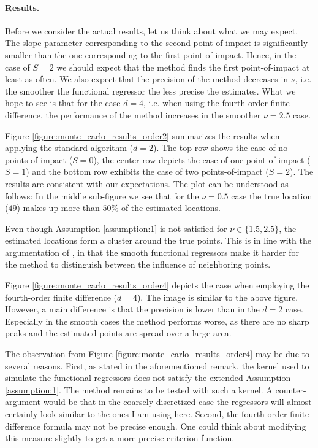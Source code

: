 \paragraph{Results.}

Before we consider the actual results, let us think about what we may expect. The slope
parameter corresponding to the second point-of-impact is significantly smaller than the
one corresponding to the first point-of-impact. Hence, in the case of $S = 2$ we should
expect that the method finds the first point-of-impact at least as often. We also expect
that the precision of the method decreases in $\nu$, i.e. the smoother the functional
regressor the less precise the estimates. What we hope to see is that for the case $d =
4$, i.e. when using the fourth-order finite difference, the performance of the method
increases in the smoother $\nu = 2.5$ case.

Figure \ref{figure:monte_carlo_results_order2} summarizes the results when applying the
standard algorithm ($d = 2$). The top row shows the case of no points-of-impact ($S =
0$), the center row depicts the case of one point-of-impact ($S = 1$) and the bottom row
exhibits the case of two points-of-impact ($S = 2$). The results are consistent with our
expectations. The plot can be understood as follows: In the middle sub-figure we see that
for the $\nu = 0.5$ case the true location ($49$) makes up more than $50\%$ of the
estimated locations.

Even though Assumption \ref{assumption:1} is not satisfied for $\nu \in \{1.5, 2.5\}$,
the estimated locations form a cluster around the true points. This is in line with the
argumentation of \cite{Kneip2020}, in that the smooth functional regressors make it
harder for the method to distinguish between the influence of neighboring points.

Figure \ref{figure:monte_carlo_results_order4} depicts the case when employing the
fourth-order finite difference ($d = 4$). The image is similar to the above figure.
However, a main difference is that the precision is lower than in the $d=2$ case.
Especially in the smooth cases the method performs worse, as there are no sharp peaks
and the estimated points are spread over a large area.

The observation from Figure \ref{figure:monte_carlo_results_order4} may be due to
several reasons. First, as stated in the aforementioned remark, the kernel used to
simulate the functional regressors does not satisfy the extended Assumption
\ref{assumption:1}. The method remains to be tested with such a kernel. A
counter-argument would be that in the coarsely discretized case the regressors will
almost certainly look similar to the ones I am using here. Second, the fourth-order
finite difference formula may not be precise enough. One could think about modifying
this measure slightly to get a more precise criterion function.

